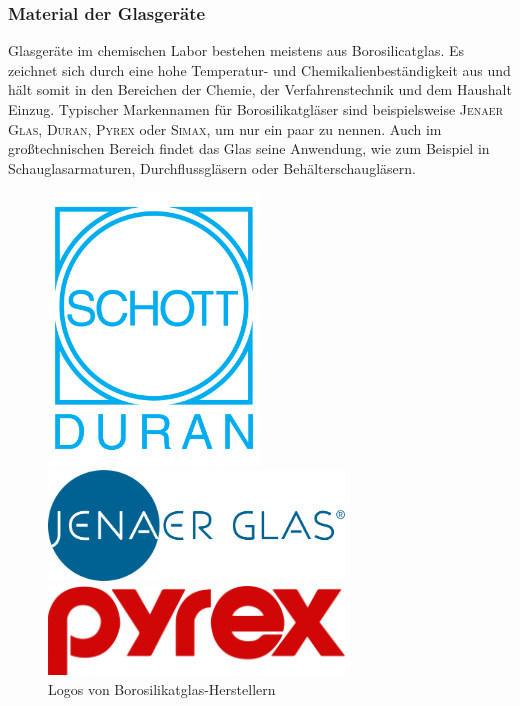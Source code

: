 \subsubsection*{Material der Glasgeräte}
Glasgeräte im chemischen Labor bestehen meistens aus Borosilicatglas. Es zeichnet sich durch eine hohe Temperatur- und Chemikalienbeständigkeit aus und hält somit in den Bereichen der Chemie, der Verfahrenstechnik und dem Haushalt Einzug. Typischer Markennamen für Borosilikatgläser sind beispielsweise \textsc{Jenaer Glas}, \textsc{Duran}, \textsc{Pyrex} oder \textsc{Simax}, um nur ein paar zu nennen.
Auch im großtechnischen Bereich findet das Glas seine Anwendung, wie zum Beispiel in Schauglasarmaturen, Durchflussgläsern oder Behälterschaugläsern. 
\begin{figure}[h!]
		\centering
		\begin{minipage}{0.3\textwidth}
			\includegraphics[width=0.5\textwidth]{img/logo_duran}
		\end{minipage}
		\begin{minipage}{0.30\textwidth}
			\includegraphics[width=0.7\textwidth]{img/logo_jenaerglas}
		\end{minipage}
		\begin{minipage}{0.30\textwidth}
			\includegraphics[width=0.7\textwidth]{img/logo_pyrex}
		\end{minipage}
		\caption{Logos von Borosilikatglas-Herstellern}
\end{figure}
\FloatBarrier

